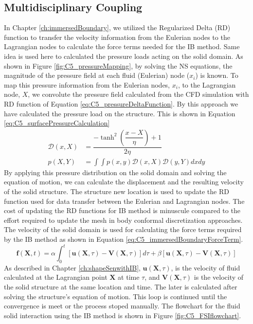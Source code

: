 \subsection{Multidisciplinary Coupling}
In Chapter \ref{ch:immersedBoundary}, we utilized the Regularized Delta (RD) function to transfer the velocity information from the Eulerian nodes to the Lagrangian nodes to calculate the force terms needed for the IB method. Same idea is used here to calculated the pressure loads acting on the solid domain. As shown in Figure \ref{fig:C5_pressureMapping}, by solving the NS equations, the magnitude of the pressure field at each fluid (Eulerian) node ($x_i$) is known. To map this pressure information from the Eulerian nodes, $x_i$, to the Lagrangian node, $X$, we convolute the pressure field calculated from the CFD simulation with RD function of Equation \eqref{eq:C5_pressureDeltaFunction}.  By this approach we have calculated the pressure load on the structure. This is shown in Equation \eqref{eq:C5_surfacePressureCalculation}
%
\begin{subequations}
\begin{align}
    \mathcal{D}(x, X) &=
    \dfrac{-\tanh^{2}{\left (\dfrac{x - X}{\eta} \right )} + 1}{2 \eta}
    \label{eq:C5_pressureDeltaFunction}
    \\
    p(X, Y) &= \int \int p(x,y) \mathcal{D}(x, X) \mathcal{D}(y, Y) dx dy
    \label{eq:C5_surfacePressureCalculation}
\end{align}
\end{subequations}
%
By applying this pressure distribution on the solid domain and solving the equation of motion, we can calculate the displacement and the resulting velocity of the solid structure. The structure new location is used to update the RD function used for data transfer between the Eulerian and Lagrangian nodes. The cost of updating the RD functions for IB method is minuscule compared to the effort required to update the mesh in body conformal discretization approaches. The velocity of the solid domain is used for calculating the force terms required by the IB method as shown in Equation \eqref{eq:C5_immersedBoundaryForceTerm}.
%
\begin{equation}\label{eq:C5_immersedBoundaryForceTerm}
    \mathbf{f}(\mathbf{X}, t) = 
    \alpha \int_0^t \left[ \mathbf{u}(\mathbf{X}, \tau) - \mathbf{V}(\mathbf{X}, \tau) \right] d\tau + 
    \beta \left[ \mathbf{u}(\mathbf{X}, \tau) - \mathbf{V}(\mathbf{X}, \tau) \right]
\end{equation}
%
As described in Chapter \ref{ch:shapeSenwithIB}, $\mathbf{u}(\mathbf{X}, \tau)$, is the velocity of fluid calculated at the Lagrangian point $\mathbf{X}$ at time $\tau$, and $\mathbf{V}(\mathbf{X}, \tau)$ is the velocity of the solid structure at the same location and time. The later is calculated after solving the structure's equation of motion. This loop is continued until the convergence is meet or the process stoped manually. The flowchart for the fluid solid interaction using the IB method is shown in Figure \ref{fig:C5_FSIflowchart}.